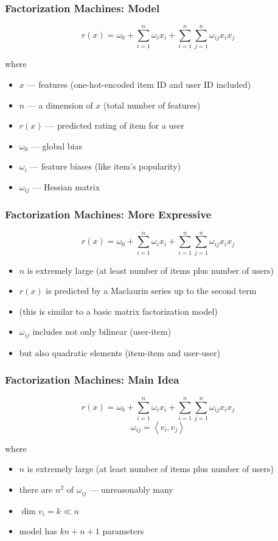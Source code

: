 \documentclass{beamer}
\begin{document}
\begin{frame}
  \frametitle{Factorization Machines: Model}
  \begin{exampleblock}  {}$$r\left(x\right)=\omega_0+\sum\limits_{i=1}^n\omega_ix_i+\sum\limits_{i=1}^n\sum\limits_{j=1}^n\omega_{ij}x_ix_j$$
  \end{exampleblock}
  where
  \begin{itemize}
  \item $x$ --- features (one-hot-encoded item ID and user ID included)
  \item $n$ --- a dimension of $x$ (total number of features)
  \item $r\left(x\right)$ --- predicted rating of item for a user
  \item $\omega_0$ --- global bias
  \item $\omega_i$ --- feature biases (like item's popularity)
  \item $\omega_{ij}$ --- Hessian matrix
  \end{itemize}
\end{frame}
\begin{frame}
  \frametitle{Factorization Machines: More Expressive}
  \begin{exampleblock}  {}$$r\left(x\right)=\omega_0+\sum\limits_{i=1}^n\omega_ix_i+\sum\limits_{i=1}^n\sum\limits_{j=1}^n\omega_{ij}x_ix_j$$
  \end{exampleblock}
  \begin{itemize}
  \item $n$ is extremely large (at least number of items plus number of users)
  \item $r\left(x\right)$ is predicted by a Maclaurin series up to the second term
  \item (this is similar to a basic matrix factorization model)
  \item $\omega_{ij}$ includes not only bilinear (user-item)
  \item but also quadratic elements (item-item and user-user)
  \end{itemize}
\end{frame}
\begin{frame}
  \frametitle{Factorization Machines: Main Idea}
  \begin{exampleblock}  {}$$r\left(x\right)=\omega_0+\sum\limits_{i=1}^n\omega_ix_i+\sum\limits_{i=1}^n\sum\limits_{j=1}^n\omega_{ij}x_ix_j$$
    $$\omega_{ij}=\left<v_i,v_j\right>$$
  \end{exampleblock}
  where
  \begin{itemize}
  \item $n$ is extremely large (at least number of items plus number of users)
  \item there are $n^2$ of $\omega_{ij}$ --- unreasonably many
  \item $\dim v_i=k\ll n$
  \item model has $kn + n + 1$ parameters
  \end{itemize}
\end{frame}
\end{document}

